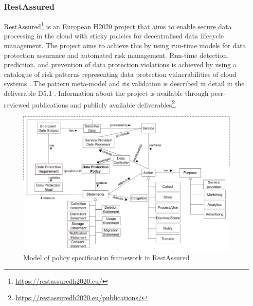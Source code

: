 \subsubsection{RestAssured}
RestAssured\footnote{\url{https://restassuredh2020.eu/}} is an European H2020 project that aims to enable secure data processing in the cloud with sticky policies for decentralised data lifecycle management.
The project aims to achieve this by using run-time models for data protection assurance and automated risk management. Run-time detection, prediction, and prevention of data protection violations is achieved by using a catalogue of risk patterns representing data protection vulnerabilities of cloud systems \cite{palm_modelling_2018,braubach_using_2018}. The pattern meta-model and its validation is described in detail in the deliverable D5.1 \cite{noauthor_d5.1_2018}. Information about the project is available through peer-reviewed publications and publicly available deliverables\footnote{\url{https://restassuredh2020.eu/publications/}}.
\begin{figure}[htbp]
    \centering
    \includegraphics[width=\linewidth]{img/RestAssured_model.png}
    \caption{Model of policy specification framework in RestAssured \cite{RestAssured_D6.1}}
    \label{fig:RestAssured-model}
\end{figure}

